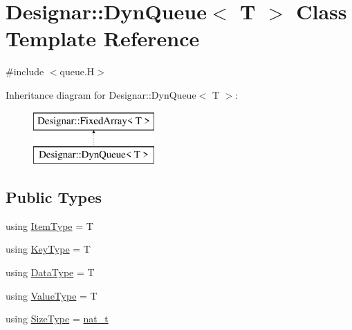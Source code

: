 \hypertarget{class_designar_1_1_dyn_queue}{}\section{Designar\+:\+:Dyn\+Queue$<$ T $>$ Class Template Reference}
\label{class_designar_1_1_dyn_queue}


{\ttfamily \#include $<$queue.\+H$>$}

Inheritance diagram for Designar\+:\+:Dyn\+Queue$<$ T $>$\+:\begin{figure}[H]
\begin{center}
\leavevmode
\includegraphics[height=2.000000cm]{class_designar_1_1_dyn_queue}
\end{center}
\end{figure}
\subsection*{Public Types}
\begin{DoxyCompactItemize}
\item 
using \hyperlink{class_designar_1_1_dyn_queue_a45a4b5b9dd6a921dbc6919802d34dd9e}{Item\+Type} = T
\item 
using \hyperlink{class_designar_1_1_dyn_queue_a0591681d66d914b3fb11f71d36759984}{Key\+Type} = T
\item 
using \hyperlink{class_designar_1_1_dyn_queue_a79504f1ab8156a3eaee8c9c0aaaf1b8a}{Data\+Type} = T
\item 
using \hyperlink{class_designar_1_1_dyn_queue_a6528f67f5ad9ecbe0f8a21b88f3cb832}{Value\+Type} = T
\item 
using \hyperlink{class_designar_1_1_dyn_queue_a376b5cd2f4a47d734fc1e73955197358}{Size\+Type} = \hyperlink{namespace_designar_aa72662848b9f4815e7bf31a7cf3e33d1}{nat\+\_\+t}
\end{DoxyCompactItemize}

